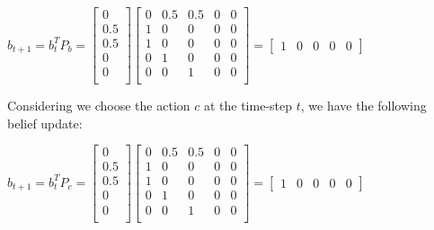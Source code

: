 \documentclass{article}
\begin{document}
\medskip

$
  \hat{b}_{t+1} = b_t^T P_b = 
  \begin{bmatrix}
    0 \\
    0.5 \\
    0.5 \\
    0 \\
    0 \\
  \end{bmatrix}
  \begin{bmatrix}
    0 & 0.5 & 0.5 & 0 & 0 \\
    1 & 0 & 0 & 0 & 0 \\
    1 & 0 & 0 & 0 & 0 \\
    0 & 1 & 0 & 0 & 0 \\
    0 & 0 & 1 & 0 & 0 \\
  \end{bmatrix} = \begin{bmatrix}
    1 & 0 & 0 & 0 & 0
  \end{bmatrix}
$

\bigskip

Considering we choose the action $c$ at the time-step $t$, we have the following belief update:

\medskip

$
  \hat{b}_{t+1} = b_t^T P_c = 
  \begin{bmatrix}
    0 \\
    0.5 \\
    0.5 \\
    0 \\
    0 \\
  \end{bmatrix}
  \begin{bmatrix}
    0 & 0.5 & 0.5 & 0 & 0 \\
    1 & 0 & 0 & 0 & 0 \\
    1 & 0 & 0 & 0 & 0 \\
    0 & 1 & 0 & 0 & 0 \\
    0 & 0 & 1 & 0 & 0 \\
  \end{bmatrix}
  = \begin{bmatrix}
    1 & 0 & 0 & 0 & 0
  \end{bmatrix}
$
\end{document}
